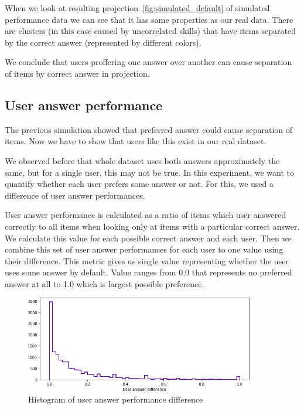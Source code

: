 \documentclass[
  printed, %
  table,   %
  nolof,     %
  nolot,     %
  color,
  final,
  nocover
]{fithesis3}
\begin{document}
When we look at resulting projection~\ref{fig:simulated_default} of simulated performance data we can see that it has same properties as our real data. There are clusters (in this case caused by uncorrelated skills) that have items separated by the correct answer (represented by different colors).

We conclude that users proffering one answer over another can cause separation of items by correct answer in projection.


\subsection{User answer performance}\label{user-answer-performance}


The previous simulation showed that preferred answer could cause separation of items. Now we have to show that users like this exist in our real dataset.

We observed before that whole dataset uses both answers approximately the same, but for a single user, this may not be true. In this experiment, we want to quantify whether each user prefers some answer or not. For this, we used a difference of user answer performances.

User answer performance is calculated as a ratio of items which user answered correctly to all items when looking only at items with a particular correct answer. We calculate this value for each possible correct answer and each user. Then we combine this set of user answer performances for each user to one value using their difference. This metric gives us single value representing whether the user uses some answer by default. Value ranges from 0.0 that represents no preferred answer at all to 1.0 which is largest possible preference.

\begin{figure}
  \includegraphics[width=10cm]{img/uneven_answers_hist}
  \caption{Histogram of user answer performance difference}
  \label{fig:uneven_answers_hist}
\end{figure}
\end{document}
